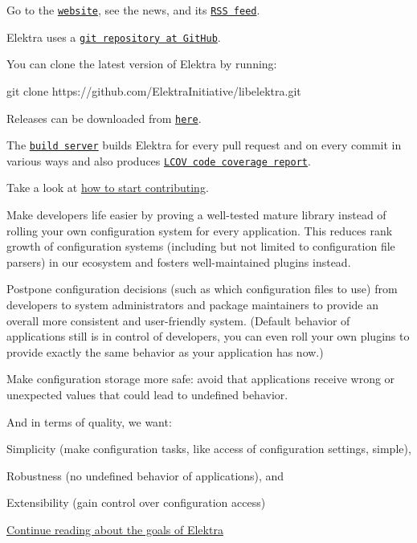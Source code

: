 Go to the \href{https://www.libelektra.org}{\tt website}, see the news, and its \href{https://www.libelektra.org/news/feed.rss}{\tt R\+SS feed}.

Elektra uses a \href{https://github.com/ElektraInitiative/libelektra}{\tt git repository at Git\+Hub}.

You can clone the latest version of Elektra by running\+:


\begin{DoxyCode}
git clone https://github.com/ElektraInitiative/libelektra.git
\end{DoxyCode}


Releases can be downloaded from \href{https://www.libelektra.org/ftp/elektra/releases/}{\tt here}.

The \href{https://build.libelektra.org/}{\tt build server} builds Elektra for every pull request and on every commit in various ways and also produces \href{https://doc.libelektra.org/coverage/master/debian-buster-full/}{\tt L\+C\+OV code coverage report}.

Take a look at \hyperlink{doc_IDEAS_md}{how to start contributing}.


\begin{DoxyItemize}
\item Make developer\textquotesingle{}s life easier by proving a well-\/tested mature library instead of rolling your own configuration system for every application. This reduces rank growth of configuration systems (including but not limited to configuration file parsers) in our ecosystem and fosters well-\/maintained plugins instead.
\item Postpone configuration decisions (such as which configuration files to use) from developers to system administrators and package maintainers to provide an overall more consistent and user-\/friendly system. (Default behavior of applications still is in control of developers, you can even roll your own plugins to provide exactly the same behavior as your application has now.)
\item Make configuration storage more safe\+: avoid that applications receive wrong or unexpected values that could lead to undefined behavior.
\end{DoxyItemize}

And in terms of quality, we want\+:


\begin{DoxyEnumerate}
\item Simplicity (make configuration tasks, like access of configuration settings, simple),
\item Robustness (no undefined behavior of applications), and
\item Extensibility (gain control over configuration access)
\end{DoxyEnumerate}

\hyperlink{doc_GOALS_md}{Continue reading about the goals of Elektra} 